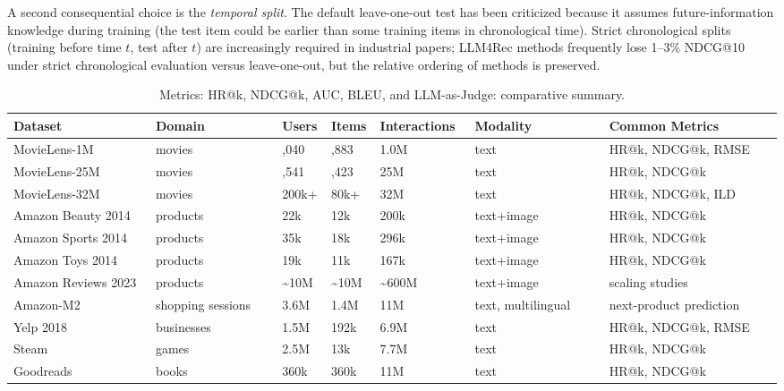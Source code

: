 \documentclass{article}
\begin{document}
A second consequential choice is the \emph{temporal split}. The default leave-one-out test has been criticized because it assumes future-information knowledge during training (the test item could be earlier than some training items in chronological time). Strict chronological splits (training before time \(t\), test after \(t\)) are increasingly required in industrial papers; LLM4Rec methods frequently lose 1--3\% NDCG@10 under strict chronological evaluation versus leave-one-out, but the relative ordering of methods is preserved.

\begin{table}[t]
\centering
\caption{Metrics: HR@k, NDCG@k, AUC, BLEU, and LLM-as-Judge: comparative summary.}
\label{tab:metrics-hr-k-ndcg-k-auc-bleu-and-llm-as-judge}
\begin{tabular}{>{\raggedright\arraybackslash}p{0.1845\linewidth}
  >{\raggedright\arraybackslash}p{0.1650\linewidth}
  >{\raggedright\arraybackslash}p{0.0680\linewidth}
  >{\raggedright\arraybackslash}p{0.0583\linewidth}
  >{\raggedright\arraybackslash}p{0.1262\linewidth}
  >{\raggedright\arraybackslash}p{0.1748\linewidth}
  >{\raggedright\arraybackslash}p{0.2233\linewidth}}
\toprule
Dataset & Domain & Users & Items & Interactions & Modality & Common Metrics \\
\midrule
MovieLens-1M & movies & 6,040 & 3,883 & 1.0M & text & HR@k, NDCG@k, RMSE \\
MovieLens-25M & movies & 162,541 & 62,423 & 25M & text & HR@k, NDCG@k \\
MovieLens-32M & movies & 200k+ & 80k+ & 32M & text & HR@k, NDCG@k, ILD \\
Amazon Beauty 2014 & products & 22k & 12k & 200k & text+image & HR@k, NDCG@k \\
Amazon Sports 2014 & products & 35k & 18k & 296k & text+image & HR@k, NDCG@k \\
Amazon Toys 2014 & products & 19k & 11k & 167k & text+image & HR@k, NDCG@k \\
Amazon Reviews 2023 & products & \textasciitilde10M & \textasciitilde10M & \textasciitilde600M & text+image & scaling studies \\
Amazon-M2 & shopping sessions & 3.6M & 1.4M & 11M & text, multilingual & next-product prediction \\
Yelp 2018 & businesses & 1.5M & 192k & 6.9M & text & HR@k, NDCG@k, RMSE \\
Steam & games & 2.5M & 13k & 7.7M & text & HR@k, NDCG@k \\
Goodreads & books & 360k & 360k & 11M & text & HR@k, NDCG@k \\

\end{tabular}
\end{table}
\end{document}
